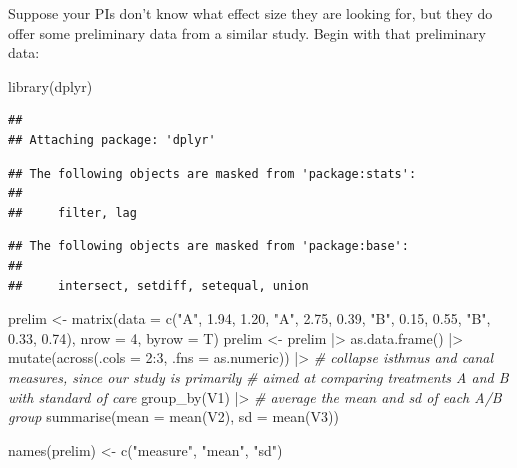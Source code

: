 \documentclass[
]{book}
\newenvironment{Shaded}{\begin{snugshade}}{\end{snugshade}}
\newcommand{\AttributeTok}[1]{\textcolor[rgb]{0.77,0.63,0.00}{#1}}
\newcommand{\CommentTok}[1]{\textcolor[rgb]{0.56,0.35,0.01}{\textit{#1}}}
\newcommand{\DecValTok}[1]{\textcolor[rgb]{0.00,0.00,0.81}{#1}}
\newcommand{\FloatTok}[1]{\textcolor[rgb]{0.00,0.00,0.81}{#1}}
\newcommand{\FunctionTok}[1]{\textcolor[rgb]{0.00,0.00,0.00}{#1}}
\newcommand{\NormalTok}[1]{#1}
\newcommand{\OtherTok}[1]{\textcolor[rgb]{0.56,0.35,0.01}{#1}}
\newcommand{\SpecialCharTok}[1]{\textcolor[rgb]{0.00,0.00,0.00}{#1}}
\newcommand{\StringTok}[1]{\textcolor[rgb]{0.31,0.60,0.02}{#1}}
\begin{document}
Suppose your PIs don't know what effect size they are looking for, but they do offer some preliminary data from a similar study. Begin with that preliminary data:

\begin{Shaded}
\begin{Highlighting}[]
\FunctionTok{library}\NormalTok{(dplyr)}
\end{Highlighting}
\end{Shaded}

\begin{verbatim}
## 
## Attaching package: 'dplyr'
\end{verbatim}

\begin{verbatim}
## The following objects are masked from 'package:stats':
## 
##     filter, lag
\end{verbatim}

\begin{verbatim}
## The following objects are masked from 'package:base':
## 
##     intersect, setdiff, setequal, union
\end{verbatim}

\begin{Shaded}
\begin{Highlighting}[]
\NormalTok{prelim }\OtherTok{\textless{}{-}} \FunctionTok{matrix}\NormalTok{(}\AttributeTok{data =} \FunctionTok{c}\NormalTok{(}\StringTok{"A"}\NormalTok{, }\FloatTok{1.94}\NormalTok{, }\FloatTok{1.20}\NormalTok{,}
                             \StringTok{"A"}\NormalTok{, }\FloatTok{2.75}\NormalTok{, }\FloatTok{0.39}\NormalTok{,}
                             \StringTok{"B"}\NormalTok{, }\FloatTok{0.15}\NormalTok{, }\FloatTok{0.55}\NormalTok{,}
                             \StringTok{"B"}\NormalTok{, }\FloatTok{0.33}\NormalTok{, }\FloatTok{0.74}\NormalTok{),}
                    \AttributeTok{nrow =} \DecValTok{4}\NormalTok{,}
                    \AttributeTok{byrow =}\NormalTok{ T)}
\NormalTok{prelim }\OtherTok{\textless{}{-}}\NormalTok{ prelim }\SpecialCharTok{|\textgreater{}} 
  \FunctionTok{as.data.frame}\NormalTok{() }\SpecialCharTok{|\textgreater{}}
  \FunctionTok{mutate}\NormalTok{(}\FunctionTok{across}\NormalTok{(}\AttributeTok{.cols =} \DecValTok{2}\SpecialCharTok{:}\DecValTok{3}\NormalTok{, }\AttributeTok{.fns =}\NormalTok{ as.numeric)) }\SpecialCharTok{|\textgreater{}}
  \CommentTok{\# collapse isthmus and canal measures, since our study is primarily }
  \CommentTok{\# aimed at comparing treatments A and B with standard of care }
  \FunctionTok{group\_by}\NormalTok{(V1) }\SpecialCharTok{|\textgreater{}} 
  \CommentTok{\# average the mean and sd of each A/B group }
  \FunctionTok{summarise}\NormalTok{(}\AttributeTok{mean =} \FunctionTok{mean}\NormalTok{(V2),}
            \AttributeTok{sd =} \FunctionTok{mean}\NormalTok{(V3))}

\FunctionTok{names}\NormalTok{(prelim) }\OtherTok{\textless{}{-}} \FunctionTok{c}\NormalTok{(}\StringTok{"measure"}\NormalTok{, }\StringTok{"mean"}\NormalTok{, }\StringTok{"sd"}\NormalTok{)}
\end{Highlighting}
\end{Shaded}
\end{document}
